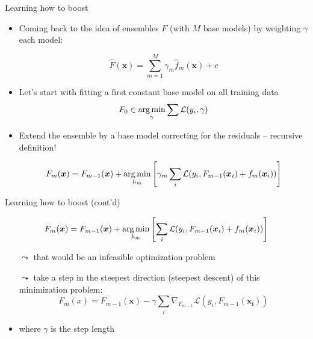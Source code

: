 \documentclass[aspectratio=169]{../latex_main/tntbeamer}  %
\begin{document}
	\begin{frame}[c]{Learning how to boost}

    \vspace{-1em}
    \begin{itemize}
        \item Coming back to the idea of ensembles $F$ (with $M$ base models) by weighting $\gamma$ each model:
        
        $$ \hat{F}(\bm{x}) = \sum_{m=1}^{M} \gamma_m \hat{f}_m(\bm{x}) + c $$
        \item Let's start with fitting a first constant base model on all training data
        $$F_0 \in \operatorname*{arg\,min}_{\gamma} \sum \mathcal{L}(y_i, \gamma) $$
        \item Extend the ensemble by a base model correcting for the residuals -- recursive definition!
        
        $$ F_m (\bm{x}) = F_{m-1}(\bm{x}) + \operatorname*{arg\,min}_{h_m} \left[ \gamma_m \sum_i \mathcal{L}(y_i, F_{m-1}(\bm{x}_i) + f_m(\bm{x}_i)) \right] $$
    \end{itemize}

	\end{frame}
	
	\begin{frame}[c]{Learning how to boost (cont'd)}

    \vspace{-1em}
    $$ F_m (\bm{x}) = F_{m-1}(\bm{x}) + \operatorname*{arg\,min}_{h_m} \left[ \sum_i \mathcal{L}(y_i, F_{m-1}(\bm{x}_i) + f_m(\bm{x}_i)) \right] $$
    \begin{itemize}
        \item[$\leadsto$] that would be an infeasible optimization problem
        \item[$\leadsto$] take a step in the steepest direction (steepest descent) of this minimization problem:
        $$ F_m(x) = F_{m-1}(\bm{x}) - \gamma \sum_i \nabla_{F_{m-1}} \mathcal{L}(y_i, F_{m-1}(\bm{x_i})) $$
        \item where $\gamma$ is the step length
    \end{itemize}

	\end{frame}
	
\end{document}
